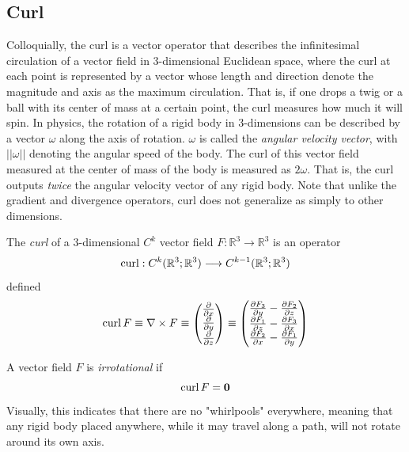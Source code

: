 \subsection{Curl}

  Colloquially, the curl is a vector operator that describes the infinitesimal circulation of a vector field in $3$-dimensional Euclidean space, where the curl at each point is represented by a vector whose length and direction denote the magnitude and axis as the maximum circulation. That is, if one drops a twig or a ball with its center of mass at a certain point, the curl measures how much it will spin. In physics, the rotation of a rigid body in 3-dimensions can be described by a vector $\omega$ along the axis of rotation. $\omega$ is called the \textit{angular velocity vector}, with $||\omega||$ denoting the angular speed of the body. The curl of this vector field measured at the center of mass of the body is measured as $2 \omega$. That is, the curl outputs \textit{twice} the angular velocity vector of any rigid body. Note that unlike the gradient and divergence operators, curl does not generalize as simply to other dimensions. 

  \begin{definition}[Curl]
  The \textit{curl} of a 3-dimensional $C^k$ vector field $F: \mathbb{R}^3 \longrightarrow \mathbb{R}^3$ is an operator
  \[\operatorname{curl}: C^k (\mathbb{R}^3; \mathbb{R}^3) \longrightarrow C^{k-1} (\mathbb{R}^3; \mathbb{R}^3)\]
  defined
  \[\operatorname{curl}{F} \equiv \nabla \times F \equiv \begin{pmatrix}
  \frac{\partial}{\partial x} \\ \frac{\partial}{\partial y}\\ \frac{\partial}{\partial z} \end{pmatrix} \equiv \begin{pmatrix}
  \frac{\partial F_3}{\partial y} - \frac{\partial F_2}{\partial z} \\
  \frac{\partial F_1}{\partial z} - \frac{\partial F_3}{\partial x} \\
  \frac{\partial F_2}{\partial x} - \frac{\partial F_1}{\partial y}
  \end{pmatrix}\]
  \end{definition}

  \begin{definition}
  A vector field $F$ is \textit{irrotational} if 
  \[\operatorname{curl}{F} = \mathbf{0}\]
  Visually, this indicates that there are no "whirlpools" everywhere, meaning that any rigid body placed anywhere, while it may travel along a path, will not rotate around its own axis. 
  \end{definition}

